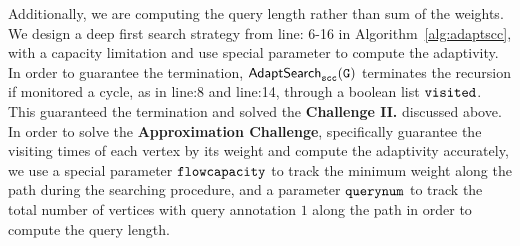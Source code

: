 Additionally, we are computing the query length rather than sum of the weights.
We design a deep first search strategy
from line: 6-16 in Algorithm~\ref{alg:adaptscc}, 
with a capacity limitation and use special parameter to compute the adaptivity.
%
\\
In order to
guarantee the termination, 
$\mathtt{\mathsf{AdaptSearch}_{scc}(G)}$
terminates the recursion if monitored a cycle, as in line:8 and line:14, through a boolean list $\mathtt{visited}$.
This guaranteed the termination and solved the \textbf{Challenge II.} discussed above.
\\
In order to
solve the \textbf{Approximation Challenge},
specifically guarantee the visiting times of each vertex by its weight
and compute the adaptivity accurately, 
we use a special parameter $\mathtt{flowcapacity}$  to track the minimum weight
along the path during the 
searching procedure, 
and a parameter $\mathtt{querynum}$
to track the total number of vertices with query annotation $1$
along the path 
in order to compute the query length.
% 


